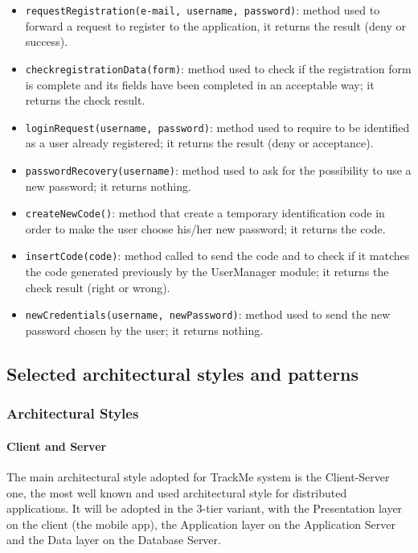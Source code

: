 \begin{itemize}
\item[ ]\texttt{requestRegistration(e-mail, username, password)}: method used to forward a request to register to the application, it returns the result (deny or success).

\item[ ]\texttt{checkregistrationData(form)}: method used to check if the registration form is complete and its fields have been completed in an acceptable way; it returns the check result.

\item[ ]\texttt{loginRequest(username, password)}: method used to require to be identified as a user already registered; it returns the result (deny or acceptance).

\item[ ]\texttt{passwordRecovery(username)}: method used to ask for the possibility to use a new password; it returns nothing.

\item[ ]\texttt{createNewCode()}: method that create a temporary identification code in order to make the user choose his/her new password; it returns the code.

\item[ ]\texttt{insertCode(code)}: method called to send the code and to check if it matches the code generated previously by the UserManager module; it returns the check result (right or wrong).

\item[ ]\texttt{newCredentials(username, newPassword)}: method used to send the new password chosen by the user; it returns nothing.
\end{itemize}

\subsection{Selected architectural styles and patterns}
\subsubsection{Architectural Styles}
\paragraph{Client and Server}
The main architectural style adopted for TrackMe system is the Client-Server one, the most well known and used architectural style for distributed applications. It will be adopted in the 3-tier variant, with the Presentation layer on the client (the mobile app), the Application layer on the Application Server and the Data layer on the Database Server.

